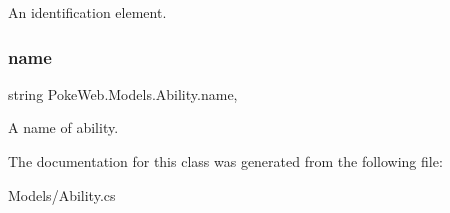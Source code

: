 An identification element. \mbox{\label{class_poke_web_1_1_models_1_1_ability_aa67ea4b0ec6b00a54c6c41315e57ee59}} 
\subsubsection{\texorpdfstring{name}{name}}
{\footnotesize\ttfamily string Poke\+Web.\+Models.\+Ability.\+name\hspace{0.3cm}{\ttfamily [get]}, {\ttfamily [set]}}

A name of ability. 

The documentation for this class was generated from the following file\+:\begin{DoxyCompactItemize}
\item 
Models/Ability.\+cs\end{DoxyCompactItemize}
